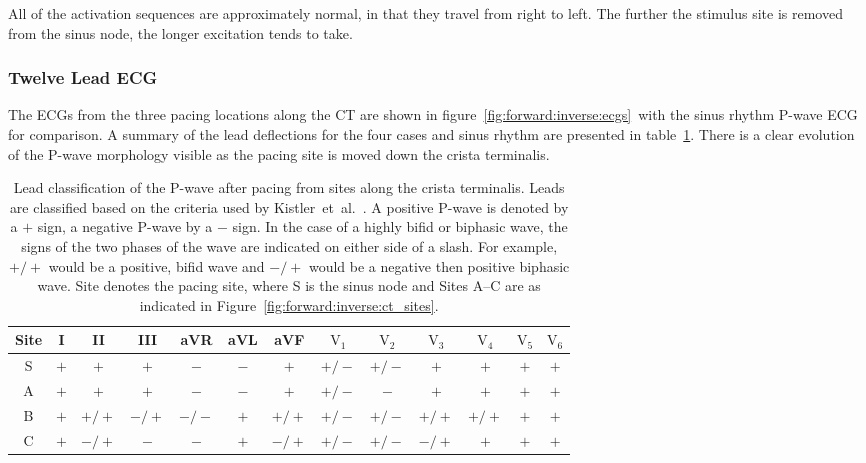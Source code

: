 All of the activation sequences are approximately normal, in that they travel
from right to left.
The further the stimulus site is removed from the sinus node, the longer
excitation tends to take.


\subsubsection{Twelve Lead ECG}

The ECGs from the three pacing locations along the CT are shown in
figure~\ref{fig:forward:inverse:ecgs}\ with the sinus rhythm P-wave ECG for
comparison.
A summary of the lead deflections for the four cases and sinus rhythm are
presented in table~\ref{tbl:forward:inverse:ecgs}.
There is a clear evolution of the P-wave morphology visible as the pacing site
is moved down the crista terminalis.

\begin{table}
\caption[Lead classification from pacing sites along the CT]{
\label{tbl:forward:inverse:ecgs}
Lead classification of the P-wave after pacing from sites along the crista
terminalis.
Leads are classified based on the criteria used by
Kistler~et~al.~\cite{Kistler2006}.
A positive P-wave is denoted by a $+$ sign, a negative P-wave by a $-$ sign.
In the case of a highly bifid or biphasic wave, the signs of the two phases of
the wave are indicated on either side of a slash.
For example, $+/+$ would be a positive, bifid wave and $-/+$ would be a negative
then positive biphasic wave.
Site denotes the pacing site, where S is the sinus node and Sites A--C are as
indicated in Figure~\ref{fig:forward:inverse:ct_sites}.
}
\begin{center}
\begin{tabular}{c c c c c c c c c c c c c}
\toprule
Site & I & II & III & aVR & aVL & aVF & $\text{V}_{\text{1}}$ &$\text{V}_{\text{2}}$ & $\text{V}_{\text{3}}$ & $\text{V}_{\text{4}}$ & $\text{V}_{\text{5}}$ & $\text{V}_{\text{6}}$\\
\midrule
S   & $+$ & $+$ & $+$ & $-$ & $-$ & $+$ & $+/-$ & $+/-$ & $+$ & $+$ & $+$ & $+$ \\
A   & $+$ & $+$ & $+$ & $-$ & $-$ & $+$ & $+/-$ & $-$ & $+$ & $+$ & $+$ & $+$ \\
B   & $+$ & $+/+$ & $-/+$ & $-/-$ & $+$ & $+/+$ & $+/-$ & $+/-$ & $+/+$ & $+/+$ & $+$ & $+$ \\
C   & $+$ & $-/+$ & $-$ & $-$ & $+$ & $-/+$ & $+/-$ & $+/-$ & $-/+$ & $+$ & $+$ & $+$ \\
\bottomrule
\end{tabular}
\end{center}
\end{table}

